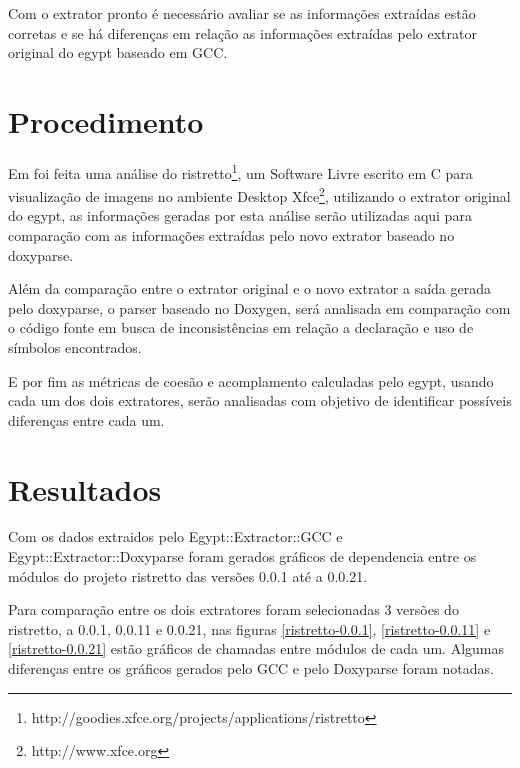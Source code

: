 Com o extrator pronto é necessário avaliar se as informações extraídas estão
corretas e se há diferenças em relação as informações extraídas pelo extrator
original do egypt baseado em GCC.

\section{Procedimento}

Em \cite{StructuralComplexityEvolution} foi feita uma análise do
ristretto\footnote{http://goodies.xfce.org/projects/applications/ristretto}, um
Software Livre escrito em C para visualização de imagens no ambiente Desktop
Xfce\footnote{http://www.xfce.org}, utilizando o extrator original do egypt, as
informações geradas por esta análise serão utilizadas aqui para comparação com
as informações extraídas pelo novo extrator baseado no doxyparse.

Além da comparação entre o extrator original e o novo extrator a saída
gerada pelo doxyparse, o parser baseado no Doxygen, será analisada em
comparação com o código fonte em busca de inconsistências em relação a
declaração e uso de símbolos encontrados.

E por fim as métricas de coesão e acomplamento calculadas pelo egypt, usando
cada um dos dois extratores, serão analisadas com objetivo de identificar
possíveis diferenças entre cada um.

\section{Resultados}

Com os dados extraidos pelo Egypt::Extractor::GCC e Egypt::Extractor::Doxyparse
foram gerados gráficos de dependencia entre os módulos do projeto ristretto das
versões 0.0.1 até a 0.0.21.

Para comparação entre os dois extratores foram selecionadas 3 versões do
ristretto, a 0.0.1, 0.0.11 e 0.0.21, nas figuras \ref{ristretto-0.0.1},
\ref{ristretto-0.0.11} e \ref{ristretto-0.0.21} estão gráficos de chamadas
entre módulos de cada um. Algumas diferenças entre os gráficos
gerados pelo GCC e pelo Doxyparse foram notadas. 

